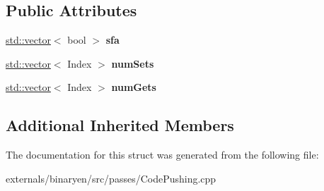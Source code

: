 \subsection*{Public Attributes}
\begin{DoxyCompactItemize}
\item 
\mbox{\label{structwasm_1_1_local_analyzer_a48f31e08693435a91245e8ac5f86cb64}} 
\mbox{\hyperlink{classstd_1_1vector}{std\+::vector}}$<$ bool $>$ {\bfseries sfa}
\item 
\mbox{\label{structwasm_1_1_local_analyzer_a7f3cc41f6b39fffa8060b63bc5e1718d}} 
\mbox{\hyperlink{classstd_1_1vector}{std\+::vector}}$<$ Index $>$ {\bfseries num\+Sets}
\item 
\mbox{\label{structwasm_1_1_local_analyzer_a20d50dd5592740b8907035cc8f9b2e00}} 
\mbox{\hyperlink{classstd_1_1vector}{std\+::vector}}$<$ Index $>$ {\bfseries num\+Gets}
\end{DoxyCompactItemize}
\subsection*{Additional Inherited Members}


The documentation for this struct was generated from the following file\+:\begin{DoxyCompactItemize}
\item 
externals/binaryen/src/passes/Code\+Pushing.\+cpp\end{DoxyCompactItemize}
